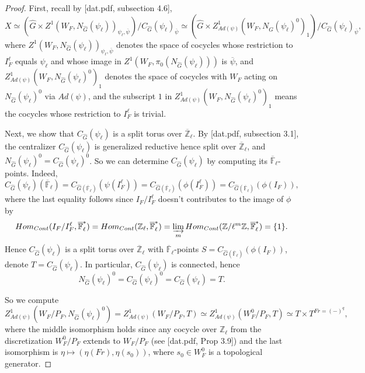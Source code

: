 \documentclass{article}
\begin{document}
	\begin{proof}
		
		
		First, recall by [dat.pdf, subsection 4.6], 
		$$X \simeq (\hat{G} \times Z^1(W_F, N_{\hat{G}}(\psi_{\ell}))_{\psi_{\ell}, \overline{\psi}})/C_{\hat{G}}(\psi_{\ell})_{\overline{\psi}} \simeq (\hat{G} \times Z^1_{Ad(\psi)}(W_F, N_{\hat{G}}(\psi_{\ell})^0)_1)/C_{\hat{G}}(\psi_{\ell})_{\overline{\psi}},$$
		where $Z^1(W_F, N_{\hat{G}}(\psi_{\ell}))_{\psi_{\ell}, \overline{\psi}}$ denotes the space of cocycles whose restriction to $I_F^\ell$ equals $\psi_{\ell}$ and whose image in $Z^1(W_F, \pi_0(N_{\hat{G}}(\psi_{\ell})))$ is $\overline{\psi}$, and $Z^1_{Ad(\psi)}(W_F, N_{\hat{G}}(\psi_{\ell})^0)_1$ denotes the space of cocycles with $W_F$ acting on $N_{\hat{G}}(\psi_{\ell})^0$ via $Ad(\psi)$, and the subscript $1$ in $Z^1_{Ad(\psi)}(W_F, N_{\hat{G}}(\psi_{\ell})^0)_1$ means the cocycles whose restriction to $I_F^\ell$ is trivial.
		
		
		Next, we show that $C_{\hat{G}}(\psi_{\ell})$ is a split torus over $\overline{\mathbb{Z}}_{\ell}$. By [dat.pdf, subsection 3.1], the centralizer $C_{\hat{G}}(\psi_{\ell})$ is generalized reductive hence split over $\overline{\mathbb{Z}}_{\ell}$, and $N_{\hat{G}}(\psi_{\ell})^0=C_{\hat{G}}(\psi_{\ell})^0$. So we can determine $C_{\hat{G}}(\psi_{\ell})$ by computing its $\overline{\mathbb{F}}_{\ell}$-points. Indeed, $$C_{\hat{G}}(\psi_{\ell})(\overline{\mathbb{F}}_{\ell})=C_{\hat{G}(\overline{\mathbb{F}}_{\ell})}(\psi(I_F^\ell))=C_{\hat{G}(\overline{\mathbb{F}}_{\ell})}(\phi(I_F^\ell))=C_{\hat{G}(\overline{\mathbb{F}}_{\ell})}(\phi(I_F)),$$
		where the last equality follows since $I_F/I_F^\ell$ doesn't contributes to the image of $\phi$ by 
		$$Hom_{Cont}(I_F/I_F^\ell, \overline{\mathbb{F}}_{\ell}^*)=Hom_{Cont}(\mathbb{Z}_\ell, \overline{\mathbb{F}}_{\ell}^*)=\varinjlim_mHom_{Cont}(\mathbb{Z}/\ell^m\mathbb{Z}, \overline{\mathbb{F}}_{\ell}^*)=\{1\}.$$ Hence $C_{\hat{G}}(\psi_{\ell})$ is a split torus over $\overline{\mathbb{Z}}_{\ell}$ with $\overline{\mathbb{F}}_{\ell}$-points $S=C_{\hat{G}(\overline{\mathbb{F}}_{\ell})}(\phi(I_F))$, denote $T=C_{\hat{G}}(\psi_{\ell})$. In particular, $C_{\hat{G}}(\psi_{\ell})$ is connected, hence 
		$$N_{\hat{G}}(\psi_{\ell})^0=C_{\hat{G}}(\psi_{\ell})^0=C_{\hat{G}}(\psi_{\ell})=T.$$
		
		So we compute
		$$Z^1_{Ad(\psi)}(W_F/P_F, N_{\hat{G}}(\psi_{\ell})^0)=Z^1_{Ad(\psi)}(W_F/P_F, T) \simeq Z^1_{Ad(\psi)}(W_F^0/P_F, T) \simeq T \times T^{Fr=(-)^q},$$
		where the middle isomorphism holds since any cocycle over $\mathbb{Z}_\ell$ from the discretization $W_F^0/P_F$ extends to $W_F/P_F$ (see [dat.pdf, Prop 3.9]) and the last isomorphism is $\eta \mapsto (\eta(Fr), \eta(s_0))$, where $s_0 \in W_F^0$ is a topological generator.
		

\end{proof}
\end{document}
